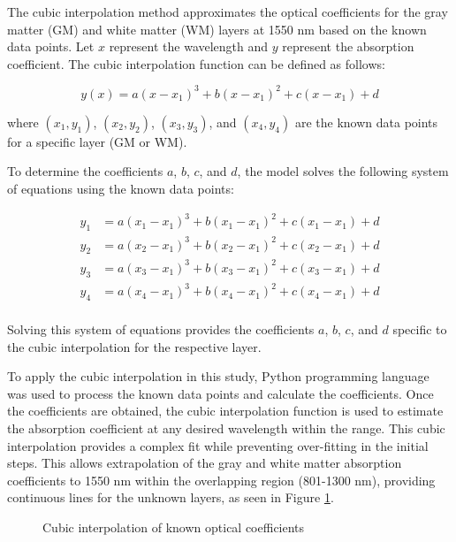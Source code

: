 \documentclass[journal,twoside,web]{ieeecolor}
\begin{document}
The cubic interpolation method approximates the optical coefficients for the gray matter (GM) and white matter (WM) layers at 1550 nm based on the 
known data points. Let $x$ represent the wavelength and $y$ represent the absorption coefficient. The cubic interpolation function can be defined as follows:

\[
y(x) = a(x-x_1)^3 + b(x-x_1)^2 + c(x-x_1) + d
\]

where $(x_1, y_1)$, $(x_2, y_2)$, $(x_3, y_3)$, and $(x_4, y_4)$ are the known data points for a specific layer (GM or WM).

To determine the coefficients $a$, $b$, $c$, and $d$, the model solves the following system of equations using the known data points:

\[
\begin{aligned}
y_1 &= a(x_1-x_1)^3 + b(x_1-x_1)^2 + c(x_1-x_1) + d \\
y_2 &= a(x_2-x_1)^3 + b(x_2-x_1)^2 + c(x_2-x_1) + d \\
y_3 &= a(x_3-x_1)^3 + b(x_3-x_1)^2 + c(x_3-x_1) + d \\
y_4 &= a(x_4-x_1)^3 + b(x_4-x_1)^2 + c(x_4-x_1) + d \\
\end{aligned}
\]

Solving this system of equations provides the coefficients $a$, $b$, $c$, and $d$ specific to the cubic interpolation for the respective layer.

To apply the cubic interpolation in this study, Python programming language was used to process the known data points and calculate the coefficients. 
Once the coefficients are obtained, the cubic interpolation function is used to estimate the absorption coefficient at any desired wavelength within the range. 
This cubic interpolation provides a complex fit while preventing over-fitting in the initial steps. This allows extrapolation of the gray and white matter 
absorption coefficients to 1550 nm within the overlapping region (801-1300 nm), providing continuous lines for the unknown layers, as seen in Figure \ref{fig:Known}.

\begin{figure}[!htb]
    \caption{\label{fig:Known} Cubic interpolation of known optical coefficients}
\end{figure}
\end{document}
